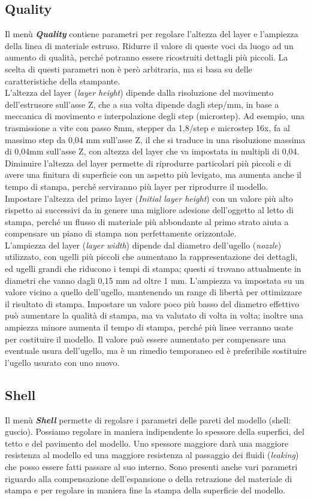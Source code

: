 \subsection{Quality}
Il menù \emph{\textbf{Quality}} contiene parametri per regolare l'altezza del layer e l'ampiezza della linea di materiale estruso. Ridurre il valore di queste voci da luogo ad un aumento di qualità, perché potranno essere ricostruiti dettagli più piccoli. La scelta di questi parametri non è però arbitraria, ma si basa su delle caratteristiche della stampante.\\
L'altezza del layer (\emph{layer height}) dipende dalla risoluzione del movimento dell'estrusore sull'asse Z, che a sua volta dipende dagli step/mm, in base a meccanica di movimento e interpolazione degli step (microstep). Ad esempio, una trasmissione a vite con passo 8mm, stepper da 1,8/step e microstep 16x, fa al massimo step da 0,04 mm sull'asse Z, il che si traduce in una risoluzione massima di 0,04mm sull'asse Z, con altezza del layer che va impostata in multipli di 0,04. Diminuire l'altezza del layer permette di riprodurre particolari più piccoli e di avere una finitura di superficie con un aspetto più levigato, ma aumenta anche il tempo di stampa, perché serviranno più layer per riprodurre il modello.
Impostare l'altezza del primo layer (\emph{Initial layer height}) con un valore più alto rispetto ai successivi da in genere una migliore adesione dell'oggetto al letto di stampa, perché un flusso di materiale più abbondante al primo strato aiuta a compensare un piano di stampa non perfettamente orizzontale.\\
L'ampiezza del layer (\emph{layer width}) dipende dal diametro dell'ugello (\emph{nozzle}) utilizzato, con ugelli più piccoli che aumentano la rappresentazione dei dettagli, ed ugelli grandi che riducono i tempi di stampa; questi si trovano attualmente in diametri che vanno dagli 0,15 mm ad oltre 1 mm. L'ampiezza va impostata su un valore vicino a quello dell'ugello, mantenendo un range di libertà per ottimizzare il risultato di stampa. Impostare un valore poco più basso del diametro effettivo può aumentare la qualità di stampa, ma va valutato di volta in volta; inoltre una ampiezza minore aumenta il tempo di stampa, perché più linee verranno usate per costituire il modello. Il valore può essere aumentato per compensare una eventuale usura dell'ugello, ma è un rimedio temporaneo ed è preferibile sostituire l'ugello usurato con uno nuovo.\\

\subsection{Shell}
Il menù \emph{\textbf{Shell}} permette di regolare i parametri delle pareti del modello (shell: guscio). Possiamo regolare in maniera indipendente lo spessore della superfici, del tetto e del pavimento del modello. Uno spessore maggiore darà una maggiore resistenza al modello ed una maggiore resistenza al passaggio dei fluidi (\emph{leaking}) che posso essere fatti passare al suo interno. Sono presenti anche vari parametri riguardo alla compensazione dell'espansione o della retrazione del materiale di stampa e per regolare in maniera fine la stampa della superficie del modello.

